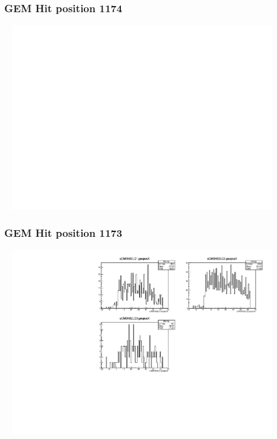 \documentclass[slidestop,compress,mathserif]{beamer}
\begin{document}
\begin{frame}\frametitle{GEM Hit position 1174}
	 \includegraphics[width=12cm,height=8cm]{GEM_Hit_position_1174.pdf}
\end{frame}
\begin{frame}\frametitle{GEM Hit position 1173}
	 \includegraphics[width=12cm,height=8cm]{GEM_Hit_position_1173.pdf}
\end{frame}
\end{document}
